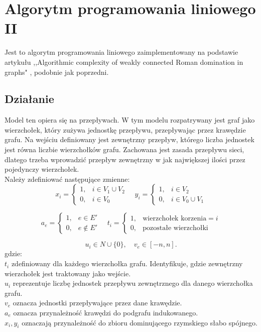 \FloatBarrier
\section{Algorytm programowania liniowego II}
Jest to algorytm programowania liniowego zaimplementowany na podstawie artykułu ,,Algorithmic complexity of weakly connected Roman domination in graphs" \cite{ILP}, podobnie jak poprzedni.
\subsection{Działanie}
Model ten opiera się na przepływach. W tym modelu rozpatrywany jest graf jako wierzchołek, który zużywa jednostkę przepływu, przepływając przez krawędzie grafu. Na wejściu definiowany jest zewnętrzny przepływ, którego liczba jednostek jest równa liczbie wierzchołków grafu. Zachowana jest zasada przepływu sieci, dlatego trzeba wprowadzić przepływ zewnętrzny w jak największej ilości przez pojedynczy wierzchołek.\\
Należy zdefiniować następujące zmienne:
\[
x_i =
\begin{cases}
1, & i \in V_1 \cup V_2 \\
0, & i \in V_0
\end{cases}
\quad
y_i =
\begin{cases}
1, & i \in V_2 \\
0, & i \in V_0 \cup V_1
\end{cases}
\]

\[
a_e =
\begin{cases}
1, & e \in E' \\
0, & e \notin E'
\end{cases}
\quad
t_i =
\begin{cases}
1, & \text{wierzchołek korzenia} = i \\
0, & \text{pozostałe wierzchołki}
\end{cases}
\]

\[
u_i \in N \cup \{0\}, \quad v_e \in [-n, n].
\]
gdzie:\\
$t_i$ zdefiniowany dla każdego wierzchołka grafu. Identyfikuje, gdzie zewnętrzny wierzchołek jest traktowany jako wejście. \\
$u_i$ reprezentuje liczbę jednostek przepływu zewnętrznego dla danego wierzchołka grafu.\\
$v_e$ oznacza jednostki przepływające przez dane krawędzie.\\
$a_e$ oznacza przynależność krawędzi do podgrafu indukowanego.\\
$x_i, y_i$ oznaczają przynależność do zbioru dominującego rzymskiego słabo spójnego.


